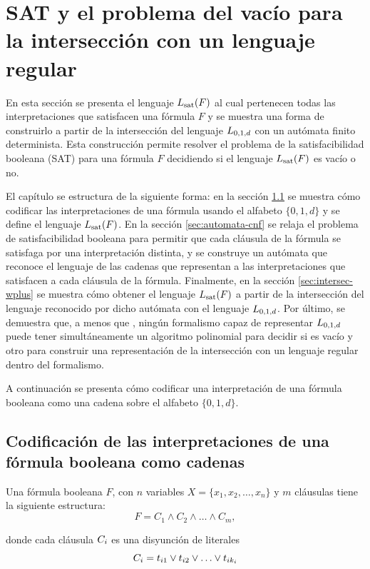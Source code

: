 \chapter{SAT y el problema del vacío para la intersección con un lenguaje regular}
\label{ch:el-teorema}

En esta sección se presenta el lenguaje $L_{\mathrm{sat}}(F)$ al cual pertenecen todas las interpretaciones que satisfacen una fórmula $F$ y se muestra una forma de construirlo a partir de la intersección del lenguaje $L_{0,1,d}$ con un autómata finito determinista. Esta construcción permite resolver el problema de la satisfacibilidad booleana (SAT) para una fórmula $F$ decidiendo si el lenguaje $L_{\mathrm{sat}}(F)$ es vacío o no.

El capítulo se estructura de la siguiente forma: en la sección \ref{sec:codification} se muestra cómo codificar las interpretaciones de una fórmula usando el alfabeto $\{0, 1, d\}$ y se define el lenguaje $L_{\mathrm{sat}}(F)$. En la sección \ref{sec:automata-cnf} se relaja el problema de satisfacibilidad booleana para permitir que cada cláusula de la fórmula se satisfaga por una interpretación distinta, y se construye un autómata que reconoce el lenguaje de las cadenas que representan a las interpretaciones que satisfacen a cada cláusula de la fórmula. Finalmente, en la sección \ref{sec:intersec-wplus} se muestra cómo obtener el lenguaje $L_{\mathrm{sat}}(F)$ a partir de la intersección del lenguaje reconocido por dicho autómata con el lenguaje $L_{0,1,d}$. Por último, se demuestra que, a menos que \pnp, ningún formalismo capaz de representar $L_{0,1,d}$ puede tener simultáneamente un algoritmo polinomial para decidir si es vacío y otro para construir una representación de la intersección con un lenguaje regular dentro del formalismo.

A continuación se presenta cómo codificar una interpretación de una fórmula booleana como una cadena sobre el alfabeto $\{0, 1, d\}$.

\section{Codificación de las interpretaciones de una fórmula booleana como cadenas}
\label{sec:codification}

Una fórmula booleana $F$, con $n$ variables $X = \{x_1, x_2, \ldots, x_n\}$ y $m$ cláusulas tiene la siguiente estructura:
$$
    F = C_1 \land C_2 \land \ldots \land C_m,
$$

donde cada cláusula $C_i$ es una disyunción de literales
$$
    C_i = t_{i1} \lor t_{i2} \lor \ldots \lor t_{ik_i}
$$

